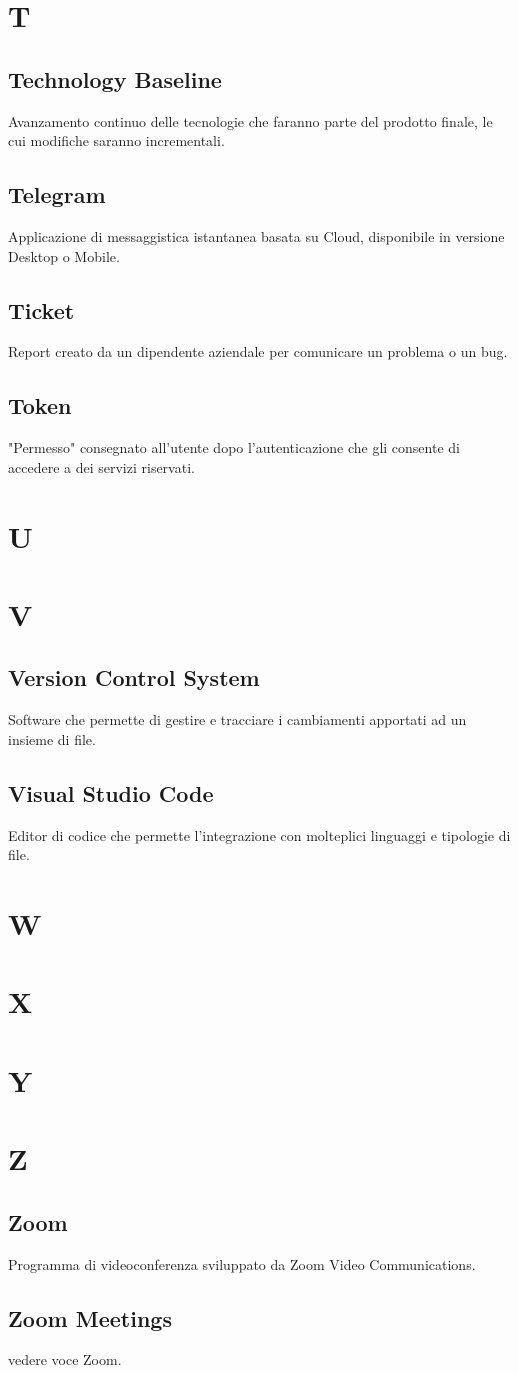 \section{T}
\subsection{Technology Baseline}
Avanzamento continuo delle tecnologie che faranno parte del prodotto finale, le cui modifiche saranno incrementali.
\subsection{Telegram}
Applicazione di messaggistica istantanea basata su Cloud, disponibile in versione Desktop o Mobile.
\subsection{Ticket}
Report creato da un dipendente aziendale per comunicare un problema o un bug.
\subsection{Token}  
"Permesso" consegnato all'utente dopo l'autenticazione che gli consente di accedere a dei servizi riservati.
\newpage
\section{U}
\section{V}
\subsection{Version Control System}
Software che permette di gestire e tracciare i cambiamenti apportati ad un insieme di file.
\subsection{Visual Studio Code}
Editor di codice che permette l'integrazione con molteplici linguaggi e tipologie di file.
\newpage
\section{W}
\section{X}
\section{Y}
\section{Z}
\subsection{Zoom}
Programma di videoconferenza sviluppato da Zoom Video Communications.
\subsection{Zoom Meetings}
vedere voce Zoom.

